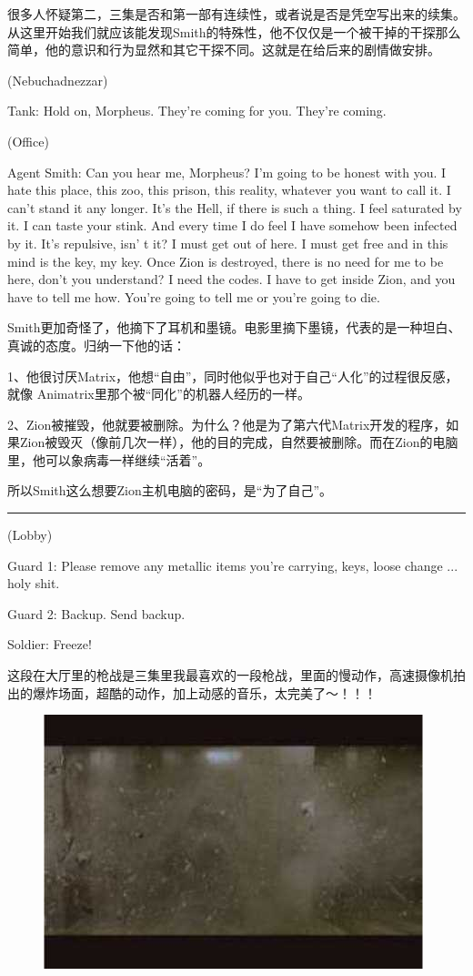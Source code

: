 \documentclass[UTF8]{ctexart}
\newcommand{\myparsep}{\noindent \rule[0.5ex]{\linewidth}{1pt}}
\newenvironment{myquote}{\color{green} \setlength{\leftskip}{6em} \setlength{\rightskip}{4em} \setlength{\parindent}{-2em}}{\par}
\begin{document}
很多人怀疑第二，三集是否和第一部有连续性，或者说是否是凭空写出来的续集。从这里开始我们就应该能发现Smith的特殊性，他不仅仅是一个被干掉的干探那么简单，他的意识和行为显然和其它干探不同。这就是在给后来的剧情做安排。

\begin{myquote}
(Nebuchadnezzar)

Tank: Hold on, Morpheus. They're coming for you. They're coming.

(Office)

Agent Smith: Can you hear me, Morpheus? I'm going to be honest with you. I hate this place, this zoo, this prison, this reality, whatever you want to call it. I can't stand it any longer. It's the Hell, if there is such a thing. I feel saturated by it. I can taste your stink. And every time I do feel I have somehow been infected by it. It's repulsive, isn' t it? I must get out of here. I must get free and in this mind is the key, my key. Once Zion is destroyed, there is no need for me to be here, don't you understand? I need the codes. I have to get inside Zion, and you have to tell me how. You're going to tell me or you're going to die.
\end{myquote}

Smith更加奇怪了，他摘下了耳机和墨镜。电影里摘下墨镜，代表的是一种坦白、真诚的态度。归纳一下他的话：

1、他很讨厌Matrix，他想“自由”，同时他似乎也对于自己“人化”的过程很反感，就像 Animatrix里那个被“同化”的机器人经历的一样。

2、Zion被摧毁，他就要被删除。为什么？他是为了第六代Matrix开发的程序，如果Zion被毁灭（像前几次一样），他的目的完成，自然要被删除。而在Zion的电脑里，他可以象病毒一样继续“活着”。

所以Smith这么想要Zion主机电脑的密码，是“为了自己”。

\myparsep

\begin{myquote}
(Lobby)

Guard 1: Please remove any metallic items you're carrying, keys, loose change ... holy shit.

Guard 2: Backup. Send backup.

Soldier: Freeze!
\end{myquote}

这段在大厅里的枪战是三集里我最喜欢的一段枪战，里面的慢动作，高速摄像机拍出的爆炸场面，超酷的动作，加上动感的音乐，太完美了～！！！

\begin{figure}[htb]
\centering
\includegraphics[width=0.5\linewidth]{fig/read_Matrix-63}
\end{figure}
\end{document}
